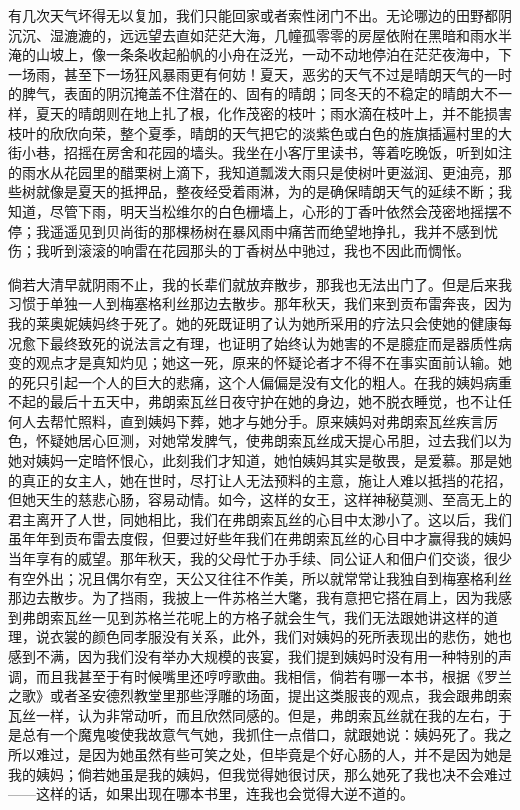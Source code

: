 \par 有几次天气坏得无以复加，我们只能回家或者索性闭门不出。无论哪边的田野都阴沉沉、湿漉漉的，远远望去直如茫茫大海，几幢孤零零的房屋依附在黑暗和雨水半淹的山坡上，像一条条收起船帆的小舟在泛光，一动不动地停泊在茫茫夜海中，下一场雨，甚至下一场狂风暴雨更有何妨！夏天，恶劣的天气不过是晴朗天气的一时的脾气，表面的阴沉掩盖不住潜在的、固有的晴朗；同冬天的不稳定的晴朗大不一样，夏天的晴朗则在地上扎了根，化作茂密的枝叶；雨水滴在枝叶上，并不能损害枝叶的欣欣向荣，整个夏季，晴朗的天气把它的淡紫色或白色的旌旗插遍村里的大街小巷，招摇在房舍和花园的墙头。我坐在小客厅里读书，等着吃晚饭，听到如注的雨水从花园里的醋栗树上滴下，我知道瓢泼大雨只是使树叶更滋润、更油亮，那些树就像是夏天的抵押品，整夜经受着雨淋，为的是确保晴朗天气的延续不断；我知道，尽管下雨，明天当松维尔的白色栅墙上，心形的丁香叶依然会茂密地摇摆不停；我遥遥见到贝尚街的那棵杨树在暴风雨中痛苦而绝望地挣扎，我并不感到忧伤；我听到滚滚的响雷在花园那头的丁香树丛中驰过，我也不因此而惆怅。
\par 倘若大清早就阴雨不止，我的长辈们就放弃散步，那我也无法出门了。但是后来我习惯于单独一人到梅塞格利丝那边去散步。那年秋天，我们来到贡布雷奔丧，因为我的莱奥妮姨妈终于死了。她的死既证明了认为她所采用的疗法只会使她的健康每况愈下最终致死的说法言之有理，也证明了始终认为她害的不是臆症而是器质性病变的观点才是真知灼见；她这一死，原来的怀疑论者才不得不在事实面前认输。她的死只引起一个人的巨大的悲痛，这个人偏偏是没有文化的粗人。在我的姨妈病重不起的最后十五天中，弗朗索瓦丝日夜守护在她的身边，她不脱衣睡觉，也不让任何人去帮忙照料，直到姨妈下葬，她才与她分手。原来姨妈对弗朗索瓦丝疾言厉色，怀疑她居心叵测，对她常发脾气，使弗朗索瓦丝成天提心吊胆，过去我们以为她对姨妈一定暗怀恨心，此刻我们才知道，她怕姨妈其实是敬畏，是爱慕。那是她的真正的女主人，她在世时，尽打让人无法预料的主意，施让人难以抵挡的花招，但她天生的慈悲心肠，容易动情。如今，这样的女王，这样神秘莫测、至高无上的君主离开了人世，同她相比，我们在弗朗索瓦丝的心目中太渺小了。这以后，我们虽年年到贡布雷去度假，但要过好些年我们在弗朗索瓦丝的心目中才赢得我的姨妈当年享有的威望。那年秋天，我的父母忙于办手续、同公证人和佃户们交谈，很少有空外出；况且偶尔有空，天公又往往不作美，所以就常常让我独自到梅塞格利丝那边去散步。为了挡雨，我披上一件苏格兰大氅，我有意把它搭在肩上，因为我感到弗朗索瓦丝一见到苏格兰花呢上的方格子就会生气，我们无法跟她讲这样的道理，说衣裳的颜色同孝服没有关系，此外，我们对姨妈的死所表现出的悲伤，她也感到不满，因为我们没有举办大规模的丧宴，我们提到姨妈时没有用一种特别的声调，而且我甚至于有时候嘴里还哼哼歌曲。我相信，倘若有哪一本书，根据《罗兰之歌》或者圣安德烈教堂里那些浮雕的场面，提出这类服丧的观点，我会跟弗朗索瓦丝一样，认为非常动听，而且欣然同感的。但是，弗朗索瓦丝就在我的左右，于是总有一个魔鬼唆使我故意气气她，我抓住一点借口，就跟她说：姨妈死了。我之所以难过，是因为她虽然有些可笑之处，但毕竟是个好心肠的人，并不是因为她是我的姨妈；倘若她虽是我的姨妈，但我觉得她很讨厌，那么她死了我也决不会难过——这样的话，如果出现在哪本书里，连我也会觉得大逆不道的。
